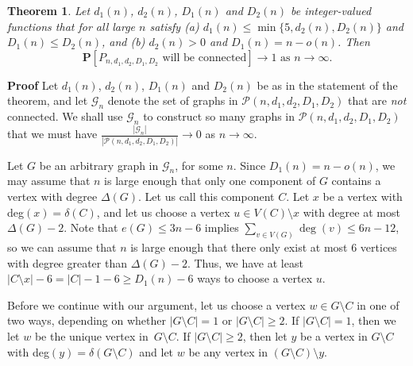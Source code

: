 \documentclass{article}
\newtheorem{Theorem}{Theorem}
\newtheorem{Proof of Theorem}{Proof of Theorem}
\begin{document}
\begin{Theorem} \label{bounded315}
Let $d_{1}(n)$, $d_{2}(n)$, $D_{1}(n)$ and $D_{2}(n)$ 
be integer-valued functions that for all large $n$ satisfy
(a) $d_{1}(n) \leq \min \{ 5, d_{2}(n), D_{2}(n) \}$ and $D_{1}(n) \leq D_{2}(n)$,
and (b) $d_{2}(n)>0$ and $D_{1}(n)=n-o(n)$.
Then
\begin{displaymath}
\mathbf{P}[P_{n,d_{1},d_{2},D_{1},D_{2}} \textrm{ will be connected}] \to 1 \textrm{ as } n \to \infty.
\end{displaymath}
\end{Theorem}
\textbf{Proof}
Let $d_{1}(n)$, $d_{2}(n)$, $D_{1}(n)$ and $D_{2}(n)$ 
be as in the statement of the theorem,
and let $\mathcal{G}_{n}$ denote the set of graphs in $\mathcal{P}(n,d_{1},d_{2},D_{1},D_{2})$ 
that are \textit{not} connected.
We shall use $\mathcal{G}_{n}$ to construct so many graphs in $\mathcal{P}(n,d_{1},d_{2},D_{1},D_{2})$
that we must have $\frac{|\mathcal{G}_{n}|}{|\mathcal{P}(n,d_{1},d_{2},D_{1},D_{2})|} \to 0$ as $n \to \infty$.

Let $G$ be an arbitrary graph in $\mathcal{G}_{n}$, for some $n$.
Since $D_{1}(n) = n-o(n)$,
we may assume that $n$ is large enough that 
only one component of $G$ contains a vertex with degree $\Delta(G)$.
Let us call this component $C$.
Let $x$ be a vertex with deg$(x) = \delta(C)$,
and let us choose a vertex $u \in V(C) \setminus x$ with degree at most~$\Delta(G)-2$.
Note that $e(G) \leq 3n-6$ implies $\sum_{v \in V(G)} \deg(v) \leq 6n-12$,
so we can assume that $n$ is large enough that there
only exist at most $6$ vertices with degree greater than $\Delta(G)-2$.
Thus, we have at least $|C \setminus x|-6 =|C|-1-6 \geq D_{1}(n)-6$
ways to choose a vertex $u$.

Before we continue with our argument,
let us choose a vertex $w \in G \setminus C$ in one of two ways,
depending on whether $|G \setminus C|=1$ or $|G \setminus C| \geq 2$.
If $|G \setminus C|=1$,
then we let $w$ be the unique vertex in~$G \setminus C$.
If $|G \setminus C| \geq 2$,
then let $y$ be a vertex in $G \setminus C$ with deg$(y)=\delta(G \setminus C)$
and let $w$ be any vertex in $(G \setminus C) \setminus y$.
\end{document}
